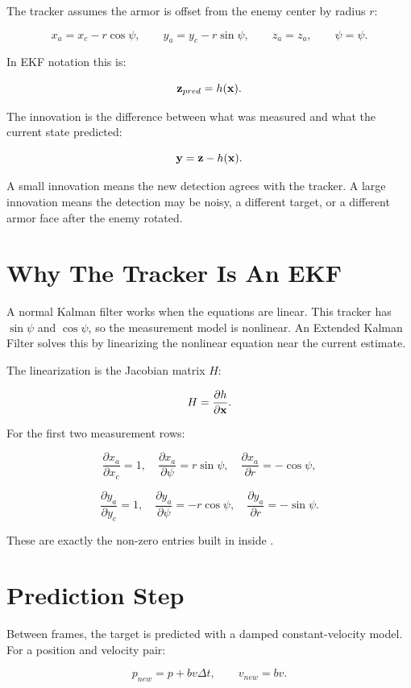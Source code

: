 The tracker assumes the armor is offset from the enemy center by radius $r$:

\[
x_a = x_c - r\cos\psi,
\qquad
y_a = y_c - r\sin\psi,
\qquad
z_a = z_a,
\qquad
\psi = \psi.
\]

In EKF notation this is:

\[
\mathbf{z}_{pred} = h(\mathbf{x}).
\]

The innovation is the difference between what was measured and what the
current state predicted:

\[
\mathbf{y} = \mathbf{z} - h(\mathbf{x}).
\]

A small innovation means the new detection agrees with the tracker. A large
innovation means the detection may be noisy, a different target, or a different
armor face after the enemy rotated.

\section{Why The Tracker Is An EKF}

A normal Kalman filter works when the equations are linear. This tracker has
$\sin\psi$ and $\cos\psi$, so the measurement model is nonlinear. An Extended
Kalman Filter solves this by linearizing the nonlinear equation near the
current estimate.

The linearization is the Jacobian matrix $H$:

\[
H =
\frac{\partial h}{\partial \mathbf{x}}.
\]

For the first two measurement rows:

\[
\frac{\partial x_a}{\partial x_c}=1,\quad
\frac{\partial x_a}{\partial \psi}=r\sin\psi,\quad
\frac{\partial x_a}{\partial r}=-\cos\psi,
\]

\[
\frac{\partial y_a}{\partial y_c}=1,\quad
\frac{\partial y_a}{\partial \psi}=-r\cos\psi,\quad
\frac{\partial y_a}{\partial r}=-\sin\psi.
\]

These are exactly the non-zero entries built in
 inside .

\section{Prediction Step}

Between frames, the target is predicted with a damped constant-velocity model.
For a position and velocity pair:

\[
p_{new} = p + b v \Delta t,
\qquad
v_{new} = b v.
\]

